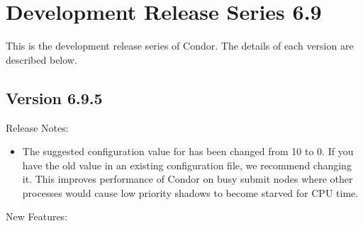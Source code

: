 
\section{\label{sec:History-6-9}Development Release Series 6.9}

This is the development release series of Condor.
The details of each version are described below.

\subsection*{\label{sec:New-6-9-5}Version 6.9.5}

\noindent Release Notes:

\begin{itemize}

\item The suggested configuration value for
 has been changed from 10 to 0.  If
you have the old value in an existing configuration file, we recommend
changing it.  This improves performance of Condor on busy submit nodes
where other processes would cause low priority shadows to become
starved for CPU time.

\end{itemize}


\noindent New Features:

